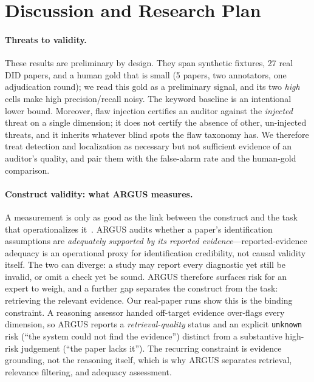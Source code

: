 \section{Discussion and Research Plan}
\label{sec:discussion}

\paragraph{Threats to validity.}
These results are preliminary by design. They span synthetic fixtures,
27 real DID papers, and a human gold that is small (5 papers, two annotators, one
adjudication round); we read this gold as a preliminary signal, and its two
\emph{high} cells make high precision/recall noisy. The keyword baseline is an
intentional lower bound. Moreover, flaw injection certifies an auditor
against the \emph{injected} threat on a single dimension; it does not certify the
absence of other, un-injected threats, and it inherits whatever blind spots the
flaw taxonomy has. We therefore treat detection and localization as necessary but
not sufficient evidence of an auditor's quality, and pair them with the
false-alarm rate and the human-gold comparison.

\paragraph{Construct validity: what ARGUS measures.}
A measurement is only as good as the link between the construct and the task that
operationalizes it~\cite{jacobs2021measurement,raji2021benchmark}. ARGUS audits
whether a paper's identification assumptions are \emph{adequately supported by its
reported evidence}---reported-evidence adequacy is an operational proxy for
identification credibility, not causal validity itself. The two can diverge: a
study may report every diagnostic yet still be invalid, or omit a check yet be
sound. ARGUS therefore surfaces risk for an expert to weigh, and a further gap
separates the construct from the task: retrieving the relevant evidence. Our real-paper runs
show this is the binding constraint. A reasoning assessor handed off-target
evidence over-flags every dimension, so ARGUS reports a \emph{retrieval-quality}
status and an explicit \texttt{unknown} risk (``the system could not find the
evidence'') distinct from a substantive high-risk judgement (``the paper lacks
it''). The recurring constraint is evidence grounding, not the reasoning itself,
which is why ARGUS separates retrieval, relevance filtering, and adequacy assessment.

